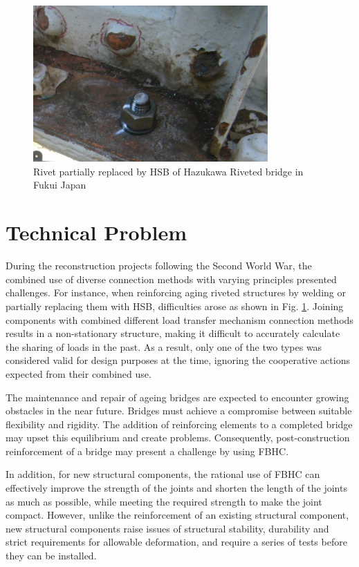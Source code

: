 \begin{figure}[htbp]
    \centering
    \includegraphics[width=0.8\textwidth]{imgs/intro/HSB-rivet.JPG}
    \caption{Rivet partially replaced by HSB of Hazukawa Riveted bridge in Fukui Japan}
    \label{fig-tprivet}
\end{figure}


\section{Technical Problem}

During the reconstruction projects following the Second World War, the combined use of diverse connection methods with varying principles presented challenges. For instance, when reinforcing aging riveted structures by welding or partially replacing them with \ac{HSB}, difficulties arose as shown in Fig. \ref{fig-tprivet}. Joining components with combined different load transfer mechanism connection methods results in a non-stationary structure, making it difficult to accurately calculate the sharing of loads in the past. As a result, only one of the two types was considered valid for design purposes at the time, ignoring the cooperative actions expected from their combined use.

The maintenance and repair of ageing bridges are expected to encounter growing obstacles in the near future. Bridges must achieve a compromise between suitable flexibility and rigidity. The addition of reinforcing elements to a completed bridge may upset this equilibrium and create problems. Consequently, post-construction reinforcement of a bridge may present a challenge by using \ac{FBHC}.

In addition, for new structural components, the rational use of \ac{FBHC} can effectively improve the strength of the joints and shorten the length of the joints as much as possible, while meeting the required strength to make the joint compact.  However, unlike the reinforcement of an existing structural component, new structural components raise issues of structural stability, durability and strict requirements for allowable deformation, and require a series of tests before they can be installed.

